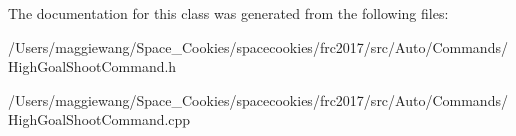 The documentation for this class was generated from the following files\+:\begin{DoxyCompactItemize}
\item 
/\+Users/maggiewang/\+Space\+\_\+\+Cookies/spacecookies/frc2017/src/\+Auto/\+Commands/High\+Goal\+Shoot\+Command.\+h\item 
/\+Users/maggiewang/\+Space\+\_\+\+Cookies/spacecookies/frc2017/src/\+Auto/\+Commands/High\+Goal\+Shoot\+Command.\+cpp\end{DoxyCompactItemize}
